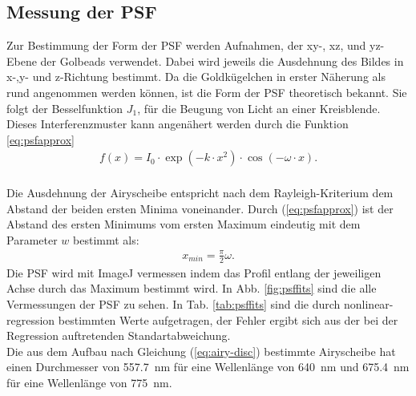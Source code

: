 \subsection{Messung der PSF}
Zur Bestimmung der Form der PSF werden Aufnahmen, der xy-, xz, und yz-Ebene der Golbeads verwendet. 
Dabei wird jeweils die Ausdehnung des Bildes in x-,y- und z-Richtung bestimmt.
Da die Goldkügelchen in erster Näherung als rund angenommen werden können, ist die Form der PSF theoretisch bekannt.
Sie folgt der Besselfunktion $J_1$, für die Beugung von Licht an einer Kreisblende.
Dieses Interferenzmuster kann angenähert werden durch die Funktion \ref{eq:psfapprox}
\begin{align}
	f(x)=I_0 \cdot \exp \left( -k \cdot x^2 \right) \cdot \cos \left(-\omega\cdot x\right). \label{eq:psfapprox}
\end{align}
\\ 
Die Ausdehnung der Airyscheibe entspricht nach dem Rayleigh-Kriterium dem Abstand der beiden ersten Minima voneinander. 
Durch (\ref{eq:psfapprox}) ist der Abstand des ersten Minimums vom ersten Maximum eindeutig mit dem Parameter $w$ bestimmt als:
\begin{align}
x_{min} = \frac{\pi}{2}\omega.
\end{align}
Die PSF wird mit ImageJ vermessen indem das Profil entlang der jeweiligen Achse durch das Maximum bestimmt wird.
In Abb. \ref{fig:psffits} sind die alle Vermessungen der PSF zu sehen. In Tab. \ref{tab:psffits} sind die durch nonlinear-regression bestimmten Werte aufgetragen, der Fehler ergibt sich aus der bei der Regression auftretenden Standartabweichung.
\\
Die aus dem Aufbau nach Gleichung (\ref{eq:airy-disc}) bestimmte Airyscheibe hat einen Durchmesser von 557.7~nm für eine Wellenlänge von 640~nm und 675.4~nm für eine Wellenlänge von 775~nm.
